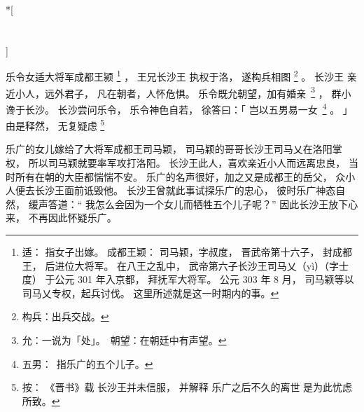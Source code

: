 
\switchcolumn[0]*[\section{}]

乐令女适大将军成都王颍%
\footnote{%
    适：
        指女子出嫁。
    成都王颖：
        司马颖，字叔度，
        晋武帝第十六子，
        封成都王，
        后进位大将军。
        在八王之乱中，
        武帝第六子长沙王司马乂（yì）（字士度）
        于公元 301 年入京都，
        拜抚军大将军。
        公元 303 年 8 月，
        司马颖等以司马乂专权，起兵讨伐。
        这里所述就是这一时期内的事。
}%
，
王兄长沙王
执权于洛，
遂构兵相图%
\footnote{%
    构兵：出兵交战。
}%
。
长沙王
亲近小人，远外君子，
凡在朝者，人怀危惧。
乐令既允朝望，加有婚\mbox{亲%
\footnote{%
    允：一说为「处」。
    朝望：在朝廷中有声望。
}}%
，
群小谗于长沙。
长沙尝问乐令，
乐令神色自若，
徐答曰：「
    岂以五男易一\mbox{女%
    \footnote{%
        五男：
            指乐广的五个儿子。
    }}%
    。
」
由是释然，
无复疑虑%
\footnote{%
    按：
        《晋书》载
        长沙王并未信服，
        并解释
        乐广之后不久的离世
        是为此忧虑所致。
}%

\switchcolumn


乐广的女儿嫁给了大将军成都王司马颖，
司马颖的哥哥长沙王司马乂在洛阳掌权，
所以司马颖就要率军攻打洛阳。
长沙王此人，喜欢亲近小人而远离忠良，
当时所有在朝的大臣都惴惴不安。
乐广的名声很好，加之又是成都王的岳父，
众小人便去长沙王面前诋毁他。
长沙王曾就此事试探乐广的忠心，
彼时乐广神态自然，
缓声答道：“
 我怎么会因为一个女儿而牺牲五个儿子呢？”
因此长沙王放下心来，
不再因此怀疑乐广。
